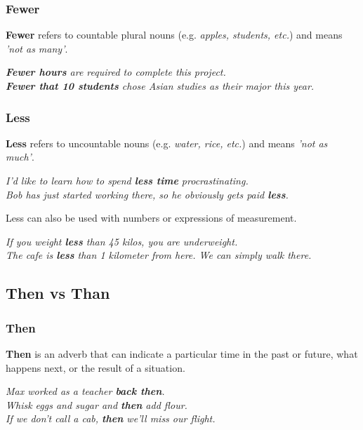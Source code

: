\documentclass[hidelinks,10pt,a4paper]{article}
\begin{document}
\subsubsection{Fewer}
\textbf{Fewer} refers to countable plural nouns (e.g. \textit{apples, students, etc.}) and means \textit{'not as many'}.
\begin{center}
	\textit{\textbf{Fewer hours} are required to complete this project.} \\
	\textit{\textbf{Fewer that 10 students} chose Asian studies as their major this year.}
\end{center}

\subsubsection{Less}
\textbf{Less} refers to uncountable nouns (e.g. \textit{water, rice, etc.}) and means \textit{'not as much'}.

\begin{center}
	\textit{I'd like to learn how to spend \textbf{less time} procrastinating.}\\
	\textit{Bob has just started working there, so he obviously gets paid \textbf{less}.}
\end{center}

Less can also be used with numbers or expressions of measurement.
\begin{center}
	\textit{If you weight \textbf{less} than 45 kilos, you are underweight.}\\
	\textit{The cafe is \textbf{less} than 1 kilometer from here. We can simply walk there.}
\end{center}

\subsection{Then vs Than}
\subsubsection{Then}
\textbf{Then} is an adverb that can indicate a particular time in the past or future, what happens next, or the result of a situation.

\begin{center}
	\textit{Max worked as a teacher \textbf{back then}.}\\
	\textit{Whisk eggs and sugar and \textbf{then} add flour.}\\
	\textit{If we don't call a cab, \textbf{then} we'll miss our flight.}
\end{center}
\end{document}
